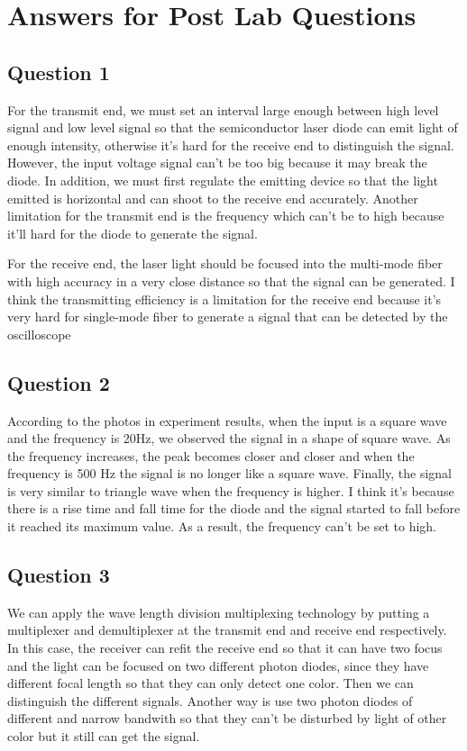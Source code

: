 \documentclass[12pt]{article}
\begin{document}
\section{Answers for Post Lab Questions}
\subsection{Question 1}
For the transmit end, we must set an interval large enough between high level signal and low level signal so that the semiconductor laser diode can emit light of enough intensity, otherwise it's hard for the receive end to distinguish the signal. However, the input voltage signal can't be too big because it may break the diode. In addition, we must first regulate the emitting device so that the light emitted is horizontal and can shoot to the receive end accurately. Another limitation for the transmit end is the frequency which can't be to high because it'll hard for the diode to generate the signal.
\par For the receive end, the laser light should be focused into the multi-mode fiber with high accuracy in a very close distance so that the signal can be generated. I think the transmitting efficiency is a limitation for the receive end because it's very hard for single-mode fiber to generate a signal that can be detected by the oscilloscope
\subsection{Question 2}
According to the photos in experiment results, when the input is a square wave and the frequency is 20Hz, we observed the signal in a shape of square wave. As the frequency increases, the peak becomes closer and closer and when the frequency is 500 Hz the signal is no longer like a square wave. Finally, the signal is very similar to triangle wave when the frequency is higher. I think it's because there is a rise time and fall time for the diode and the signal started to fall before it reached its maximum value. As a result, the frequency can't be set to high.
\subsection{Question 3}
We can apply the wave length division multiplexing technology by putting a multiplexer and demultiplexer at the transmit end and receive end respectively. In this case, the receiver can refit the receive end so that it can have two focus and the light can be focused on two different photon diodes, since they have different focal length so that they can only detect one color. Then we can distinguish the different signals. Another way is use two photon diodes of different and narrow bandwith so that they can't be disturbed by light of other color but it still can get the signal.
\end{document}
